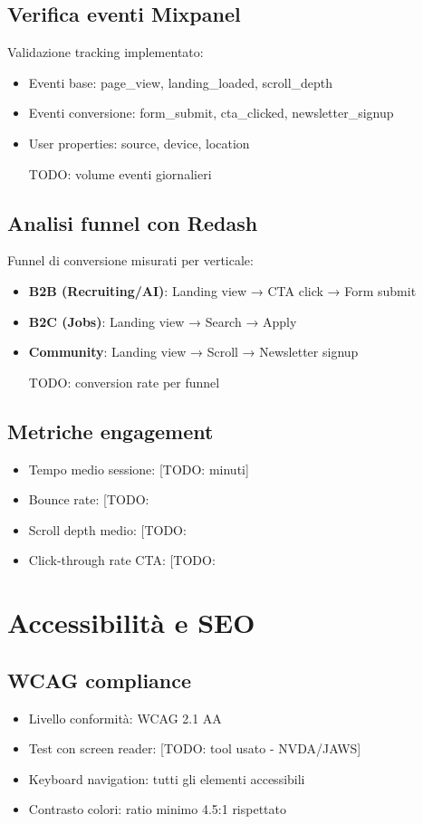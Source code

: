 \subsection{Verifica eventi Mixpanel}
Validazione tracking implementato:
\begin{itemize}
  \item Eventi base: page\_view, landing\_loaded, scroll\_depth
  \item Eventi conversione: form\_submit, cta\_clicked, newsletter\_signup
  \item User properties: source, device, location
  \item [TODO: volume eventi giornalieri]
\end{itemize}

\subsection{Analisi funnel con Redash}
Funnel di conversione misurati per verticale:
\begin{itemize}
  \item \textbf{B2B (Recruiting/AI)}: Landing view → CTA click → Form submit
  \item \textbf{B2C (Jobs)}: Landing view → Search → Apply
  \item \textbf{Community}: Landing view → Scroll → Newsletter signup
  \item [TODO: conversion rate per funnel]
\end{itemize}

\subsection{Metriche engagement}
\begin{itemize}
  \item Tempo medio sessione: [TODO: minuti]
  \item Bounce rate: [TODO: %
  \item Scroll depth medio: [TODO: %
  \item Click-through rate CTA: [TODO: %
\end{itemize}

\section{Accessibilità e SEO}
\subsection{WCAG compliance}
\begin{itemize}
  \item Livello conformità: WCAG 2.1 AA
  \item Test con screen reader: [TODO: tool usato - NVDA/JAWS]
  \item Keyboard navigation: tutti gli elementi accessibili
  \item Contrasto colori: ratio minimo 4.5:1 rispettato
\end{itemize}

